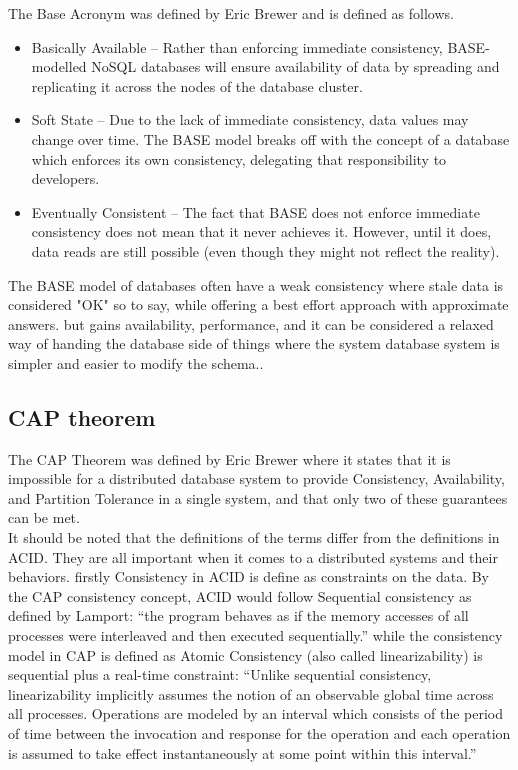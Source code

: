 \documentclass[a4paper,10pt,titlepage]{report}
\begin{document}
The Base Acronym was defined by Eric Brewer\cite{brewer2000towards} and is defined as follows.

\begin{itemize}
    \item Basically Available – Rather than enforcing immediate consistency, BASE-modelled NoSQL databases will ensure availability of data by spreading and replicating it across the nodes of the database cluster.
    \item Soft State – Due to the lack of immediate consistency, data values may change over time. The BASE model breaks off with the concept of a database which enforces its own consistency, delegating that responsibility to developers.
    \item Eventually Consistent – The fact that BASE does not enforce immediate consistency does not mean that it never achieves it. However, until it does, data reads are still possible (even though they might not reflect the reality).
\end{itemize}

The BASE model of databases often have a weak consistency where stale data is considered "OK" so to say, while offering a best effort approach with approximate answers. but gains availability, performance, and it can be considered a relaxed way of handing the database side of things where the system database system is simpler and easier to modify the schema..

\subsection{CAP theorem}

The CAP Theorem was defined by Eric Brewer\cite{CAP} where it states that it is impossible for a distributed database system to provide Consistency, Availability, and Partition Tolerance in a single system, and that only two of these guarantees can be met.\\

It should be noted that the definitions of the terms differ from the definitions in ACID. They are all important when it comes to a distributed systems and their behaviors. firstly Consistency in ACID is define as constraints on the data. By the CAP consistency concept, ACID would follow Sequential consistency as defined by Lamport\cite{lamport1993how}: “the program behaves as if the memory accesses of all processes were interleaved and then executed sequentially.” while the consistency model in CAP is defined as Atomic Consistency (also called linearizability) is sequential plus a real-time constraint: “Unlike sequential consistency, linearizability implicitly assumes the notion of an observable global time across all processes. Operations are modeled by an interval which consists of the period of time between the invocation and response for the operation and each operation is assumed to take effect instantaneously at some point within this interval.” \cite{CSL-TR-95-685}
\end{document}
